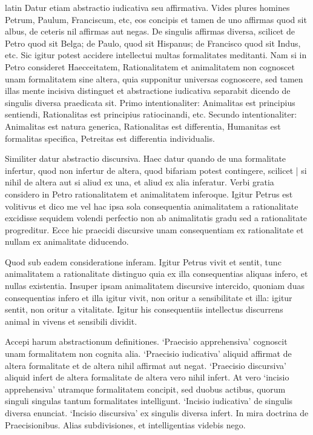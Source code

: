 \begin{otherlanguage*}{latin}
\pstart
 Datur etiam abstractio iudicativa seu affirmativa. Vides plures homines Petrum, Paulum, Franciscum, etc, eos concipis et tamen de uno affirmas quod sit albus, de ceteris nil affirmas aut negas. De singulis affirmas diversa, scilicet de Petro quod sit Belga; de Paulo, quod sit Hispanus; de Francisco quod sit Indus, etc. Sic igitur potest accidere intellectui multas formalitates meditanti. Nam si in Petro consideret Haecceitatem, Rationalitatem et animalitatem non cognoscet unam formalitatem sine altera, quia supponitur universas cognoscere, sed tamen illas mente incisiva distinguet et abstractione iudicativa separabit dicendo de singulis diversa praedicata sit. Primo intentionaliter: Animalitas est principius sentiendi, Rationalitas est principius ratiocinandi, etc. Secundo intentionaliter: Animalitas est natura generica, Rationalitas est differentia, Humanitas est formalitas specifica, Petreitas est differentia individualis. 
\pend

\pstart
 Similiter datur abstractio discursiva. Haec datur quando de una formalitate infertur, quod non infertur de altera, quod bifariam potest contingere, scilicet \textnormal{|} si nihil de altera aut si aliud ex una, et aliud ex alia inferatur. Verbi gratia considero in Petro rationalitatem et animalitatem inferoque. Igitur Petrus est volitivus et dico me vel hac ipsa sola consequentia animalitatem a rationalitate excidisse sequidem volendi perfectio non ab animalitatis gradu sed a rationalitate progreditur. Ecce hic praecidi discursive unam consequentiam ex rationalitate et nullam ex animalitate diducendo. 
\pend

\pstart
 Quod sub eadem consideratione inferam. Igitur Petrus vivit et sentit, tunc animalitatem a rationalitate distinguo quia ex illa consequentias aliquas infero, et nullas existentia. Insuper ipsam animalitatem discursive intercido, quoniam duas consequentias infero et illa igitur vivit, non oritur a sensibilitate et illa: igitur sentit, non oritur a vitalitate. Igitur his consequentiis intellectus discurrens animal in vivens et sensibili dividit. 
\pend

\pstart
 Accepi harum abstractionum definitiones. `Praecisio apprehensiva' cognoscit unam formalitatem non cognita alia. `Praecisio iudicativa' aliquid affirmat de altera formalitate et de altera nihil affirmat aut negat. `Praecisio discursiva' aliquid infert de altera formalitate de altera vero nihil infert. At vero `incisio apprehensiva' utramque formalitatem concipit, sed duobus actibus, quorum singuli singulas tantum formalitates intelligunt. `Incisio iudicativa' de singulis diversa enunciat. `Incisio discursiva' ex singulis diversa infert. In mira doctrina de Praecisionibus. Alias subdivisiones, et intelligentias videbis nego. 
\pend


\end{otherlanguage*}
